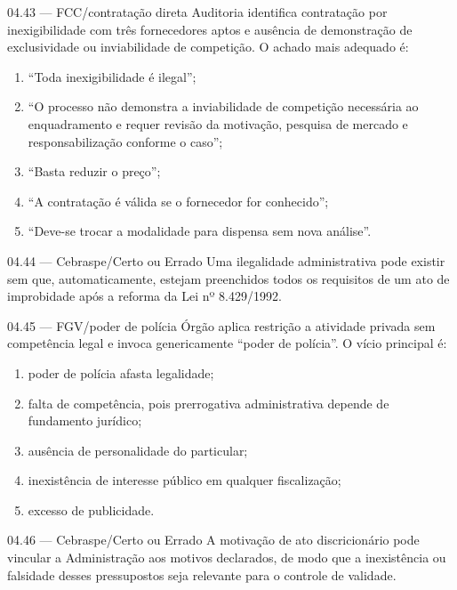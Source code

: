 \begin{questao}{ 04.43 — FCC/contratação direta}
Auditoria identifica contratação por inexigibilidade com três fornecedores aptos e ausência de demonstração de exclusividade ou inviabilidade de competição. O achado mais adequado é:
\begin{enumerate}[label=\Alph*)]
\item ``Toda inexigibilidade é ilegal'';
\item ``O processo não demonstra a inviabilidade de competição necessária ao enquadramento e requer revisão da motivação, pesquisa de mercado e responsabilização conforme o caso'';
\item ``Basta reduzir o preço'';
\item ``A contratação é válida se o fornecedor for conhecido'';
\item ``Deve-se trocar a modalidade para dispensa sem nova análise''.
\end{enumerate}
\end{questao}

\begin{questao}{ 04.44 — Cebraspe/Certo ou Errado}
Uma ilegalidade administrativa pode existir sem que, automaticamente, estejam preenchidos todos os requisitos de um ato de improbidade após a reforma da Lei nº 8.429/1992.
\end{questao}

\begin{questao}{ 04.45 — FGV/poder de polícia}
Órgão aplica restrição a atividade privada sem competência legal e invoca genericamente ``poder de polícia''. O vício principal é:
\begin{enumerate}[label=\Alph*)]
\item poder de polícia afasta legalidade;
\item falta de competência, pois prerrogativa administrativa depende de fundamento jurídico;
\item ausência de personalidade do particular;
\item inexistência de interesse público em qualquer fiscalização;
\item excesso de publicidade.
\end{enumerate}
\end{questao}

\begin{questao}{ 04.46 — Cebraspe/Certo ou Errado}
A motivação de ato discricionário pode vincular a Administração aos motivos declarados, de modo que a inexistência ou falsidade desses pressupostos seja relevante para o controle de validade.
\end{questao}


